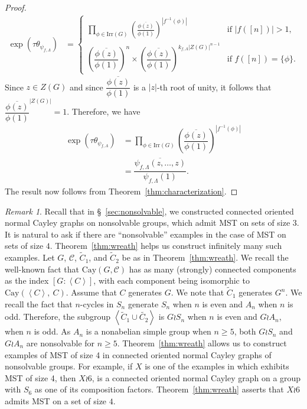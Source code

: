 \documentclass{amsart}
\theoremstyle{plain}
\theoremstyle{remark}\newtheorem{con}[theorem]{Construction}
\theoremstyle{remark} \newtheorem*{remark}{Remark}
\theoremstyle{remark} \newtheorem{example}{Example}
\newcommand{\mcal}{\mathcal}
\newcommand{\mrm}{\mathrm}
\newcommand{\ov}{\overline}
\newcommand{\irr}{\mathrm{Irr}}
\begin{document}
\begin{proof}
\begin{align*}
\exp\left( \tau \theta_{\psi_{f,\Lambda}}\right) & = \begin{cases}
\prod\limits_{\phi \in \irr(G)} \left( \frac{\ov{\phi(z)}}{\phi(1)} \right)^{|f^{-1}(\phi)|}  & \text{if $|f([n])|>1$,} \\
\left( \dfrac{\ov{\phi(z)}}{\phi(1)} \right)^{n} \times \left(\dfrac{\ov{\phi(z)}}{\phi(1)}\right)^{k_{f,\Lambda}|Z(G)|^{n-1}} & \text{if $f([n])=\{\phi\}$.}
\end{cases}
\end{align*} 
Since $z \in Z(G)$ and since $\dfrac{\ov{\phi(z)}}{\phi(1)}$ is a $|z|$-th root of unity, it follows that $\dfrac{\ov{\phi(z)}}{\phi(1)}^{|Z(G)|}=1$. Therefore, we have
\begin{align*}
\exp\left( \tau \theta_{\psi_{f,\Lambda}}\right) & = \prod\limits_{\phi \in \irr(G)} \left( \dfrac{\ov{\phi(z)}}{\phi(1)} \right)^{|f^{-1}(\phi)|} \\
&= \dfrac{\ov{\psi_{f,\Lambda}(z,\ldots, z)} }{\psi_{f,\Lambda}(1)}.
\end{align*} 
The result now follows from Theorem~\ref{thm:characterization}.
\end{proof}

\begin{remark}
Recall that in \S~\ref{sec:nonsolvable}, we constructed connected oriented normal Cayley graphs on nonsolvable groups, which admit MST on sets of size $3$. It is natural to ask if there are ``nonsolvable'' examples in the case of MST on sets of size $4$. Theorem~\ref{thm:wreath} helps us construct infinitely many such examples. Let $G$, $\mcal{C}$, $\tilde{C}_{1}$, and $\tilde{C}_{2}$ be as in Theorem~\ref{thm:wreath}. We recall the well-known fact that $\mrm{Cay}(G, \mcal{C})$ has as many (strongly) connected components as the index $[G : \left\langle C \right\rangle]$, with each component being isomorphic to $\mrm{Cay}(\left\langle C \right\rangle,\ C)$. Assume that $C$ generates $G$. We note that $\tilde{C}_{1}$ generates $G^{n}$. We recall the fact that $n$-cycles in $S_{n}$ generate $S_{n}$ when $n$ is even and $A_{n}$ when $n$ is odd. Therefore, the subgroup $\left\langle \tilde{C}_{1} \cup \tilde{C_{2}} \right\rangle$ is $G\wr S_{n}$ when $n$ is even and $G\wr A_{n}$, when $n$ is odd. 
As $A_{n}$ is a nonabelian simple group when $n\geq 5$, both $G\wr S_{n}$ and $G \wr A_{n}$ are nonsolvable for $n\geq 5$. Theorem~\ref{thm:wreath} allows us to construct examples of MST of size 4 in connected oriented normal Cayley graphs of nonsolvable groups. For example, if $X$ is one of the examples in \cite[10.2]{GodsilZhan} which exhibits MST of size 4, then $X\wr 6$, is a connected oriented normal Cayley graph on a group with $S_{6}$ as one of its composition factors. Theorem~\ref{thm:wreath} asserts that $X \wr 6$ admits MST on a set of size $4$. 
\end{remark}  
\end{document}
